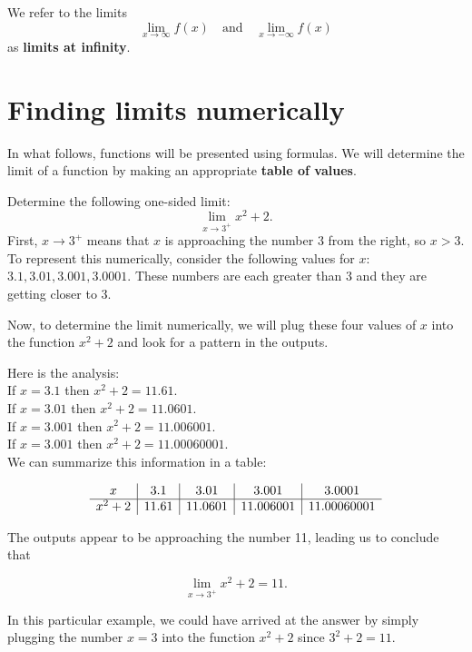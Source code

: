 \documentclass{ximera}
\begin{document}
We refer to the limits
\[\lim_{x \to \infty} f(x)  \quad \text{and} \quad \lim_{x \to -\infty} f(x) \]
as \textbf{limits at infinity}.


\section{Finding limits numerically}



In what follows, functions will be presented using formulas.  
We will determine the limit of a function by making an appropriate \textbf{table of values}.
 

\begin{example}[example 1]
Determine the following one-sided limit: 
\[\lim_{x \to 3^{+}} x^2 + 2.\]
First,  $x \to 3^{+}$ means that $x$ is approaching the number $3$ from the right, so $x > 3$. 
To represent this numerically, consider the following values for $x$: $3.1, 3.01, 3.001, 3.0001$.
These numbers are each greater than 3 and they are getting closer to 3.
 
Now, to determine the limit numerically,  we will plug these four values of $x$ into the function $x^2 + 2$ and  
look for a pattern in the outputs.

Here is the analysis:\\
If $x = 3.1$ then $x^2 + 2 = 11.61$.\\
If $x = 3.01$ then $x^2 + 2 = 11.0601$.\\
If $x = 3.001$ then $x^2 + 2 = 11.006001$.\\
If $x = 3.001$ then $x^2 + 2 = 11.00060001$.\\

We can summarize this information in a table:
  
\[
\begin{array}{ c | c | c | c | c }
  x & 3.1 & 3.01 & 3.001 & 3.0001 \\ 
	\hline
	x^2 + 2 & 11.61 & 11.0601 & 11.006001 & 11.00060001
\end{array}
\]


The outputs appear to be approaching the number 11, leading us to conclude that

\[\lim_{x \to 3^+} x^2 + 2 = 11.\] 
 
In this particular example, we could have arrived at the answer by simply plugging the number $x = 3$
into the function $x^2 + 2$ since $3^2 + 2 = 11$.  
\end{example}
\end{document}
